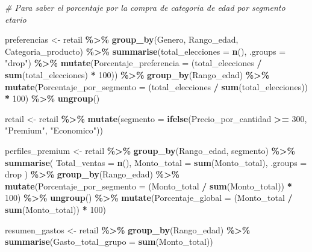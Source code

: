 \documentclass[oneside,11pt]{Latex/Classes/PhDthesisPSnPDF}
\newenvironment{Shaded}{\begin{snugshade}}{\end{snugshade}}
\newcommand{\AttributeTok}[1]{\textcolor[rgb]{0.13,0.29,0.53}{#1}}
\newcommand{\CommentTok}[1]{\textcolor[rgb]{0.56,0.35,0.01}{\textit{#1}}}
\newcommand{\DecValTok}[1]{\textcolor[rgb]{0.00,0.00,0.81}{#1}}
\newcommand{\FunctionTok}[1]{\textcolor[rgb]{0.13,0.29,0.53}{\textbf{#1}}}
\newcommand{\NormalTok}[1]{#1}
\newcommand{\OtherTok}[1]{\textcolor[rgb]{0.56,0.35,0.01}{#1}}
\newcommand{\SpecialCharTok}[1]{\textcolor[rgb]{0.81,0.36,0.00}{\textbf{#1}}}
\newcommand{\StringTok}[1]{\textcolor[rgb]{0.31,0.60,0.02}{#1}}
\begin{document}
\begin{Shaded}
\begin{Highlighting}[]
\CommentTok{\# Para saber el porcentaje por la compra de categoria de edad por segmento etario}

\NormalTok{preferencias }\OtherTok{\textless{}{-}}\NormalTok{ retail }\SpecialCharTok{\%\textgreater{}\%}
  \FunctionTok{group\_by}\NormalTok{(Genero, Rango\_edad, Categoria\_producto) }\SpecialCharTok{\%\textgreater{}\%}
  \FunctionTok{summarise}\NormalTok{(}\AttributeTok{total\_elecciones =} \FunctionTok{n}\NormalTok{(), }\AttributeTok{.groups =} \StringTok{"drop"}\NormalTok{) }\SpecialCharTok{\%\textgreater{}\%}
  \FunctionTok{mutate}\NormalTok{(}\AttributeTok{Porcentaje\_preferencia =}\NormalTok{ (total\_elecciones }\SpecialCharTok{/} \FunctionTok{sum}\NormalTok{(total\_elecciones) }\SpecialCharTok{*} \DecValTok{100}\NormalTok{)) }\SpecialCharTok{\%\textgreater{}\%} 
  \FunctionTok{group\_by}\NormalTok{(Rango\_edad) }\SpecialCharTok{\%\textgreater{}\%}
  \FunctionTok{mutate}\NormalTok{(}\AttributeTok{Porcentaje\_por\_segmento =}\NormalTok{ (total\_elecciones }\SpecialCharTok{/} \FunctionTok{sum}\NormalTok{(total\_elecciones)) }\SpecialCharTok{*} \DecValTok{100}\NormalTok{) }\SpecialCharTok{\%\textgreater{}\%}
  \FunctionTok{ungroup}\NormalTok{()}

\NormalTok{retail }\OtherTok{\textless{}{-}}\NormalTok{ retail }\SpecialCharTok{\%\textgreater{}\%}
  \FunctionTok{mutate}\NormalTok{(}\AttributeTok{segmento =} \FunctionTok{ifelse}\NormalTok{(Precio\_por\_cantidad }\SpecialCharTok{\textgreater{}=} \DecValTok{300}\NormalTok{, }\StringTok{"Premium"}\NormalTok{, }\StringTok{"Economico"}\NormalTok{))}

\NormalTok{perfiles\_premium }\OtherTok{\textless{}{-}}\NormalTok{ retail }\SpecialCharTok{\%\textgreater{}\%}
  \FunctionTok{group\_by}\NormalTok{(Rango\_edad, segmento) }\SpecialCharTok{\%\textgreater{}\%}
  \FunctionTok{summarise}\NormalTok{(}
    \AttributeTok{Total\_ventas =} \FunctionTok{n}\NormalTok{(),}
    \AttributeTok{Monto\_total =} \FunctionTok{sum}\NormalTok{(Monto\_total),}
    \AttributeTok{.groups =} \StringTok{\textquotesingle{}drop\textquotesingle{}}
\NormalTok{  ) }\SpecialCharTok{\%\textgreater{}\%}
  \FunctionTok{group\_by}\NormalTok{(Rango\_edad) }\SpecialCharTok{\%\textgreater{}\%}
  \FunctionTok{mutate}\NormalTok{(}\AttributeTok{Porcentaje\_por\_segmento =}\NormalTok{ (Monto\_total }\SpecialCharTok{/} \FunctionTok{sum}\NormalTok{(Monto\_total)) }\SpecialCharTok{*} \DecValTok{100}\NormalTok{) }\SpecialCharTok{\%\textgreater{}\%}
  \FunctionTok{ungroup}\NormalTok{() }\SpecialCharTok{\%\textgreater{}\%}
  \FunctionTok{mutate}\NormalTok{(}\AttributeTok{Porcentaje\_global =}\NormalTok{ (Monto\_total }\SpecialCharTok{/} \FunctionTok{sum}\NormalTok{(Monto\_total)) }\SpecialCharTok{*} \DecValTok{100}\NormalTok{)}
  
\NormalTok{resumen\_gastos }\OtherTok{\textless{}{-}}\NormalTok{ retail }\SpecialCharTok{\%\textgreater{}\%}
  \FunctionTok{group\_by}\NormalTok{(Rango\_edad) }\SpecialCharTok{\%\textgreater{}\%}
  \FunctionTok{summarise}\NormalTok{(}\AttributeTok{Gasto\_total\_grupo =} \FunctionTok{sum}\NormalTok{(Monto\_total)) }
\end{Highlighting}
\end{Shaded}
\end{document}

